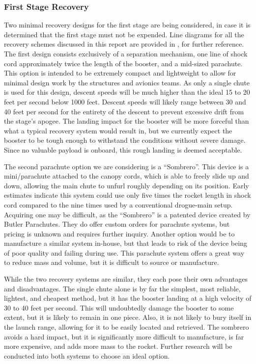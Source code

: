 \subsubsection{First Stage Recovery} %
Two minimal recovery designs for the first stage are being considered, in case it is determined that the first stage must not be expended. Line diagrams for all the recovery schemes discussed in this report are provided in , for further reference. The first design consists exclusively of a separation mechanism, one line of shock cord approximately twice the length of the booster, and a mid-sized parachute. This option is intended to be extremely compact and lightweight to allow for minimal design work by the structures and avionics teams. As only a single chute is used for this design, descent speeds will be much higher than the ideal 15 to 20 feet per second below 1000 feet. Descent speeds will likely range between 30 and 40 feet per second for the entirety of the descent to prevent excessive drift from the stage’s apogee. The landing impact for the booster will be more forceful than what a typical recovery system would result in, but we currently expect the booster to be tough enough to withstand the conditions without severe damage. Since no valuable payload is onboard, this rough landing is deemed acceptable.

The second parachute option we are considering is a ``Sombrero''. This device is a mini\-/parachute attached to the canopy cords, which is able to freely slide up and down, allowing the main chute to unfurl roughly depending on its position. Early estimates indicate this system could use only five times the rocket length in shock cord compared to the nine times used by a conventional drogue-main setup. Acquiring one may be difficult, as the ``Sombrero'' is a patented device created by Butler Parachutes. They do offer custom orders for parachute systems, but pricing is unknown and requires further inquiry. Another option would be to manufacture a similar system in-house, but that leads to risk of the device being of poor quality and failing during use. This parachute system offers a great way to reduce mass and volume, but it is difficult to source or manufacture.

While the two recovery systems are similar, they each pose their own advantages and disadvantages. The single chute alone is by far the simplest, most reliable, lightest, and cheapest method, but it has the booster landing at a high velocity of 30 to 40 feet per second. This will undoubtedly damage the booster to some extent, but it is likely to remain in one piece. Also, it is not likely to bury itself in the launch range, allowing for it to be easily located and retrieved. The sombrero avoids a hard impact, but it is significantly more difficult to manufacture, is far more expensive, and adds more mass to the rocket. Further research will be conducted into both systems to choose an ideal option.



